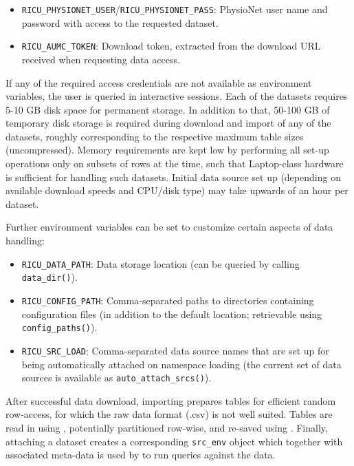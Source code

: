 \documentclass[
  notitle]{jss}
\providecommand{\tightlist}{%
  \setlength{\itemsep}{0pt}\setlength{\parskip}{0pt}}
\begin{document}
\begin{itemize}
\tightlist
\item
  \texttt{RICU\_PHYSIONET\_USER}/\texttt{RICU\_PHYSIONET\_PASS}:
  PhysioNet user name and password with access to the requested dataset.
\item
  \texttt{RICU\_AUMC\_TOKEN}: Download token, extracted from the
  download URL received when requesting data access.
\end{itemize}

If any of the required access credentials are not available as
environment variables, the user is queried in interactive sessions. Each
of the datasets requires 5-10 GB disk space for permanent storage. In
addition to that, 50-100 GB of temporary disk storage is required during
download and import of any of the datasets, roughly corresponding to the
respective maximum table sizes (uncompressed). Memory requirements are
kept low by performing all set-up operations only on subsets of rows at
the time, such that Laptop-class hardware is sufficient for handling
such datasets. Initial data source set up (depending on available
download speeds and CPU/disk type) may take upwards of an hour per
dataset.

Further environment variables can be set to customize certain aspects of
 data handling:

\begin{itemize}
\tightlist
\item
  \texttt{RICU\_DATA\_PATH}: Data storage location (can be queried by
  calling \texttt{data\_dir()}).
\item
  \texttt{RICU\_CONFIG\_PATH}: Comma-separated paths to directories
  containing configuration files (in addition to the default location;
  retrievable using \texttt{config\_paths()}).
\item
  \texttt{RICU\_SRC\_LOAD}: Comma-separated data source names that are
  set up for being automatically attached on namespace loading (the
  current set of data sources is available as
  \texttt{auto\_attach\_srcs()}).
\end{itemize}

After successful data download, importing prepares tables for efficient
random row-access, for which the raw data format (.csv) is not well
suited. Tables are read in using  \citep{hester2020},
potentially partitioned row-wise, and re-saved using . Finally,
attaching a dataset creates a corresponding \texttt{src\_env} object
which together with associated meta-data is used by  to run
queries against the data.
\end{document}
